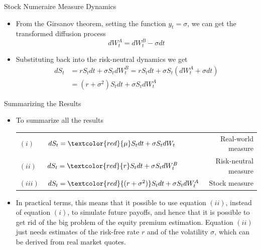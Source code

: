 \documentclass{beamer}
\begin{document}
\begin{frame}{Stock Numeraire Measure Dynamics}
  \begin{itemize}
  \item<1-> From the Girsanov theorem, setting the function $y_t = \sigma$, we can get the transformed diffusion process
    \begin{equation*}
      dW_t^A = dW_t^B - \sigma dt 
    \end{equation*}
  \item<2-> Substituting back into the risk-neutral dynamics we get
    \begin{equation*}
      \begin{aligned}
	dS_t &= r S_t dt + \sigma S_t dW_t^B = 
	rS_t dt + \sigma S_t (dW_t^A + \sigma dt) \\
	& = (r + \sigma^2)S_t dt + \sigma S_t dW^A_t
      \end{aligned}
    \end{equation*}
  \end{itemize}
\end{frame}

\begin{frame}{Summarizing the Results}
  \begin{itemize}
  \item<1-> To summarize all the results
    \vspace{0.5cm}
    \begin{table}
      \begin{tabular}{llr}
	$(i)$&$dS_t = \textcolor{red}{\mu} S_t dt + \sigma S_t dW_t$ & Real-world measure \\
	$(ii)$&$dS_t = \textcolor{red}{r}S_t dt + \sigma S_t dW_t^B$ & Risk-neutral measure \\
	$(iii)$&$dS_t = \textcolor{red}{(r + \sigma^2)}S_t dt + \sigma S_t dW^A_t$ & Stock measure\\
      \end{tabular}
    \end{table}
    \vspace{0.5cm}
  \item<2-> In practical terms, this means that it possible to use equation $(ii)$, instead of equation $(i)$, to simulate future payoffs, and hence that it is possible to get rid of the big problem of the equity premium estimation. Equation $(ii)$ just needs estimates of the risk-free rate $r$ and of the volatility $\sigma$, which can be derived from real market quotes.
  \end{itemize}
	\pause
\end{frame}
\end{document}
